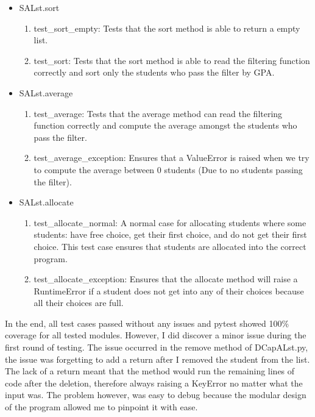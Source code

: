 \documentclass[12pt]{article}
\begin{document}
\begin{itemize}
  \item SALst.sort
    \begin{enumerate}
      \item test\_sort\_empty: Tests that the sort method is able to return a empty list.
      \item test\_sort: Tests that the sort method is able to read the filtering function correctly and sort only
      the students who pass the filter by GPA.
    \end{enumerate}

  \item SALst.average
    \begin{enumerate}
      \item test\_average: Tests that the average method can read the filtering function correctly and compute the
      average amongst the students who pass the filter.
      \item test\_average\_exception: Ensures that a ValueError is raised when we try to compute the average between
      0 students (Due to no students passing the filter).
    \end{enumerate}

  \item SALst.allocate
    \begin{enumerate}
      \item test\_allocate\_normal: A normal case for allocating students where some students: have free choice,
      get their first choice, and do not get their first choice.
      This test case ensures that students are allocated into the correct program.
      \item test\_allocate\_exception: Ensures that the allocate method will raise a RuntimeError if a student does not
      get into any of their choices because all their choices are full.
    \end{enumerate}

\end{itemize}
\medskip

In the end, all test cases passed without any issues and pytest showed 100\% coverage for all tested modules.
However, I did discover a minor issue during the first round of testing.
The issue occurred in the remove method of DCapALst.py, the issue was forgetting to add a return after I removed the
student from the list.
The lack of a return meant that the method would run the remaining lines of code after the deletion, therefore
always raising a KeyError no matter what the input was.
The problem however, was easy to debug because the modular design of the program allowed me to pinpoint it with ease.
\end{document}
